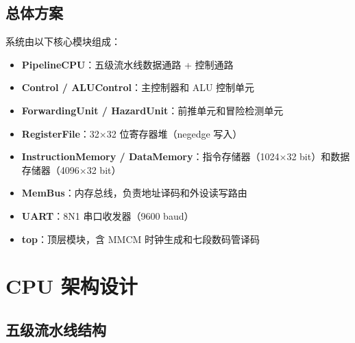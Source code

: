 \documentclass[12pt,a4paper]{ctexart}
\begin{document}
\subsection{总体方案}

系统由以下核心模块组成：
\begin{itemize}[nosep]
  \item \textbf{PipelineCPU}：五级流水线数据通路 + 控制通路
  \item \textbf{Control / ALUControl}：主控制器和 ALU 控制单元
  \item \textbf{ForwardingUnit / HazardUnit}：前推单元和冒险检测单元
  \item \textbf{RegisterFile}：32×32 位寄存器堆（negedge 写入）
  \item \textbf{InstructionMemory / DataMemory}：指令存储器（1024×32 bit）和数据存储器（4096×32 bit）
  \item \textbf{MemBus}：内存总线，负责地址译码和外设读写路由
  \item \textbf{UART}：8N1 串口收发器（9600 baud）
  \item \textbf{top}：顶层模块，含 MMCM 时钟生成和七段数码管译码
\end{itemize}

\section{CPU 架构设计}

\subsection{五级流水线结构}
\end{document}
